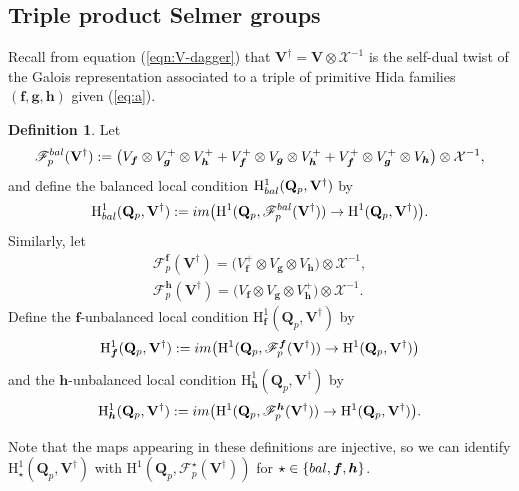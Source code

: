 \documentclass[10pt,letterpaper]{amsart}
\theoremstyle{plain}
\theoremstyle{definition}
\newtheorem{defn}[thm]{Definition}
\theoremstyle{definition}
\theoremstyle{plain}
\theoremstyle{plain}
\theoremstyle{plain}
\theoremstyle{remark}
\numberwithin{equation}{section}
\newcommand{\rH}{{\mathrm{H}}}
\newcommand{\Vdag}{{\mathbf{V}^\dagger}}
\newcommand{\unb}{{\boldsymbol{f}}}
\newcommand{\Q}{\mathbf{Q}}
\newcommand{\bff}{{\boldsymbol{f}}}
\newcommand{\bfg}{{\boldsymbol{g}}}
\newcommand{\bfh}{{\boldsymbol{h}}}
\begin{document}
\subsection{Triple product Selmer groups}
\label{subsec:tripleSelmer}

Recall from equation (\ref{eqn:V-dagger}) that $\Vdag=\mathbf{V}\otimes\mathcal{X}^{-1}$ is the self-dual twist of the Galois representation associated to a triple of primitive Hida families $(\bff,\bfg,\bfh)$ %
given (\ref{eq:a}).

\begin{defn}\label{def:local-p}
Let
\[
\mathscr{F}^{\rm bal}_p(\Vdag)%
:=\bigl(V_{\bff}\otimes V_{\bfg}^+\otimes V_{\bfh}^++V_{\bff}^+\otimes V_{\bfg}\otimes V_{\bfh}^++V_{\bff}^+\otimes V_{\bfg}^+\otimes V_{\bfh}\bigr)\otimes\mathcal{X}^{-1},
\]
and define the {balanced local condition} $\rH^1_{\rm bal}(\Q_p,\Vdag)$ by 
\[
\rH^1_{\rm bal}(\Q_p,\Vdag):={\rm im}\bigl(\rH^1(\Q_p,\mathscr{F}_p^{\rm bal}(\Vdag))\rightarrow\rH^1(\Q_p,\Vdag)\bigr).
\]
Similarly, let 
\begin{align*}
    \mathscr{F}_p^{\unb}(\Vdag)=\bigl(V_{\bff}^+\otimes V_{\bfg}\otimes V_{\bfh}\bigr)\otimes\mathcal{X}^{-1},\\
    \mathscr{F}_p^{\bfh}(\Vdag)=\bigl(V_{\bff}\otimes V_{\bfg}\otimes V_{\bfh}^+\bigr)\otimes\mathcal{X}^{-1}.
\end{align*}
 Define the {$\bff$-unbalanced local condition} $\rH^1_{\unb}(\Q_p,\Vdag)$ by
\[
\rH^1_{\bff}(\Q_p,\Vdag):={\rm im}\bigl(\rH^1(\Q_p,\mathscr{F}_p^{\bff}(\Vdag))\rightarrow\rH^1(\Q_p,\Vdag)\bigr)
\]
and the {$\bfh$-unbalanced local condition} $\rH^1_{\bfh}(\Q_p,\Vdag)$ by
\[
\rH^1_{\bfh}(\Q_p,\Vdag):={\rm im}\bigl(\rH^1(\Q_p,\mathscr{F}_p^{\bfh}(\Vdag))\rightarrow\rH^1(\Q_p,\Vdag)\bigr).
\]
\end{defn}


Note that the maps appearing in these definitions are injective, so we can identify $\rH^1_{\star}(\Q_p,\Vdag)$ with $\rH^1(\Q_p,\mathscr{F}_p^\star(\Vdag))$ for $\star\in\{{\rm bal},\bff,\bfh\}$.
\end{document}
